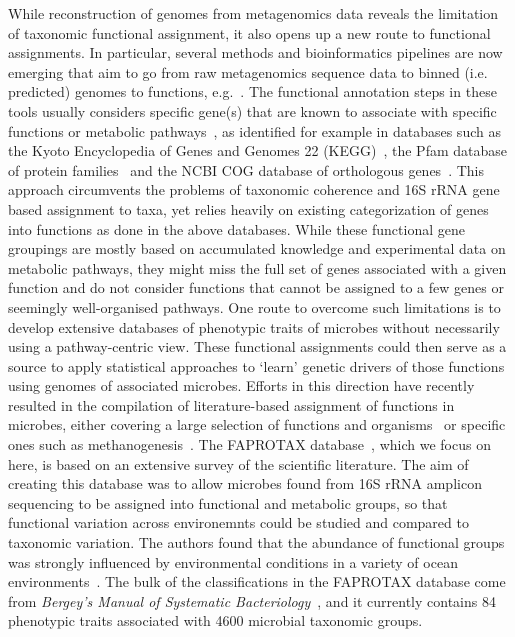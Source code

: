 \documentclass[10pt,letterpaper]{article}
\begin{document}
While reconstruction of genomes from metagenomics data reveals the limitation of
taxonomic functional assignment, it also opens up a new route to functional assignments. In
particular, several methods and bioinformatics pipelines are now emerging that aim to go
from raw metagenomics sequence data to binned (i.e. predicted) genomes to functions, e.g.~\cite{Narayanasamy2016}. The functional annotation steps in these tools usually considers
specific gene(s) that are known to associate with specific functions or metabolic pathways~\cite{Narayanasamy2016}, as identified for example in databases such as the Kyoto
Encyclopedia of Genes and Genomes 22 (KEGG)~\cite{Kanehisa2017}, the Pfam database of protein families~\cite{Finn2016} and the NCBI COG database of orthologous genes~\cite{Tatusov1997}. This approach circumvents the
problems of taxonomic coherence and 16S rRNA gene based assignment to taxa, yet relies heavily on existing categorization of genes into functions as done in the above databases. While these
functional gene groupings are mostly based on accumulated knowledge and experimental
data on metabolic pathways, they might miss the full set of genes associated with a given
function and do not consider functions that cannot be assigned to a few genes or seemingly
well-organised pathways. One route to overcome such limitations is to
develop extensive databases of phenotypic traits of microbes without necessarily using a
pathway-centric view. These functional assignments could then serve as a source to apply
statistical approaches to `learn' genetic drivers of those functions
using genomes of associated microbes. Efforts in this direction have recently resulted in
the compilation of literature-based assignment of functions in microbes, either covering a large selection of functions and organisms~\cite{Louca2016,Louca2017} or specific ones such as methanogenesis~\cite{ukaszewicz2015}. The FAPROTAX database~\cite{Louca2016}, which we focus on here, is based on an extensive survey of the scientific literature. The aim of creating this database was to allow microbes found from 16S rRNA amplicon sequencing to be assigned into functional and metabolic groups, so that functional variation across environemnts could be studied and compared to taxonomic variation. The authors found that the abundance of functional groups was strongly influenced by environmental conditions in a variety of ocean environments~\cite{Louca2016a}. The bulk of the classifications in the FAPROTAX database come from \emph{Bergey's Manual of Systematic Bacteriology}~\cite{Whitman}, and it currently contains 84 phenotypic traits associated with 4600 microbial taxonomic groups.
\end{document}
